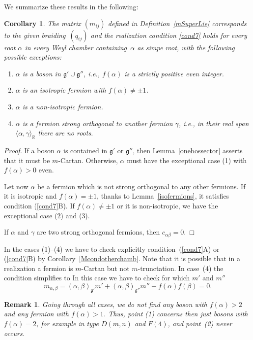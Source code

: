 \documentclass[10pt,a4paper]{amsart}
\numberwithin{equation}{section}
\newtheorem{cor}[teo]{Corollary}
\newtheorem{oss}[teo]{Remark} }
\begin{document}
We summarize these results in the following:
\begin{cor}\label{3 conditions II}
The matrix $(m_{ij})$ defined in Definition~{\rm \ref{mSuperLie}} corresponds to the given braiding~$(q_{ij})$ and the realization condition \eqref{cond7} holds for every root $\alpha$ in every Weyl chamber containing~$\alpha$ as simpe root, with the following possible exceptions:
\begin{enumerate}\itemsep=0pt
	\item[$1.$] $\alpha$ is a boson in $\mathfrak{g'}\cup \mathfrak{g''}$, i.e., $f(\alpha)$ is a strictly positive even integer.
	\item[$2.$] $\alpha$ is an isotropic fermion with $f(\alpha) \neq \pm 1$.
	\item[$3.$] $\alpha$ is a non-isotropic fermion.
	\item[$4.$] $\alpha$ is a fermion strong orthogonal to another fermion $\gamma$, i.e., in their real span $\langle \alpha, \gamma \rangle_\mathbb{R}$ there are no roots.
\end{enumerate}
\end{cor}

\begin{proof} If a boson $\alpha$ is contained in $\mathfrak{g'}$ or $\mathfrak{g''}$, then Lemma~\ref{onebossector} asserts that it must be $m$-Cartan. Otherwise, $\alpha$ must have the exceptional case (1) with $f(\alpha)>0$ even.

Let now $\alpha$ be a fermion which is not strong orthogonal to any other fermions. If it is isotropic and $f(\alpha) = \pm 1$, thanks to Lemma~\ref{isofermions}, it satisfies condition (\ref{cond7}B). If $f(\alpha) \neq \pm 1$ or it is non-isotropic, we have the exceptional case (2) and (3).

If $\alpha$ and $\gamma$ are two strong orthogonal fermions, then $c_{\alpha\beta}=0$.
\end{proof}

In the cases (1)--(4) we have to check explicitly condition~(\ref{cond7}A) or (\ref{cond7}B) by Corollary~\ref{Mcondotherchamb}. Note that it is possible that in a realization a fermion is $m$-Cartan but not $m$-trunctation. In case~(4) the condition simplifies to
In this case we have to check for which $m'$ and $m''$
\[m_{\alpha,\beta}=(\alpha,\beta)_\mathfrak{g'} m' + (\alpha,\beta)_\mathfrak{g''} m'' + f(\alpha)f(\beta) =0.\]

\begin{oss} Going through all cases, we do not find any boson with $f(\alpha)>2$ and any fermion with $f(\alpha)>1$. Thus, point (1) concerns then just bosons with $f(\alpha)=2$, for example in type $D(m,n)$ and $F(4)$, and point~(2) never occurs.
\end{oss}
\end{document}
